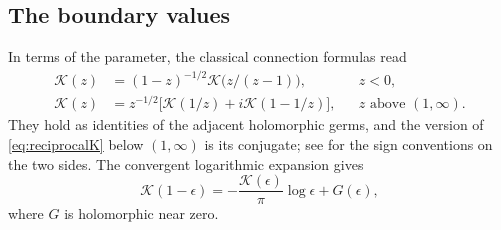 \subsection{The boundary values}
In terms of the parameter, the classical connection formulas read
\begin{align}
 \mathcal K(z)&=(1-z)^{-1/2}\mathcal K\bigl(z/(z-1)\bigr),
                 && z<0,\label{eq:imaginaryK}\\
 \mathcal K(z)&=z^{-1/2}\bigl[
     \mathcal K(1/z)+i\mathcal K(1-1/z)\bigr],
                 && z\text{ above }(1,\infty).\label{eq:reciprocalK}
\end{align}
They hold as identities of the adjacent holomorphic germs, and the version
of \eqref{eq:reciprocalK} below $(1,\infty)$ is its conjugate; see
\cite[19.7.2--19.7.3]{DLMF} for the sign conventions on the two sides.
The convergent logarithmic expansion \cite[19.12.1]{DLMF} gives
\begin{equation}\label{eq:Klog}
 \mathcal K(1-\epsilon)
   =-\frac{\mathcal K(\epsilon)}{\pi}\log\epsilon+G(\epsilon),
\end{equation}
where $G$ is holomorphic near zero.

